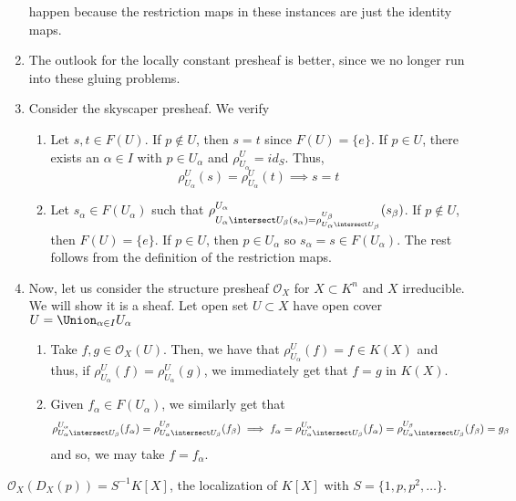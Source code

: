 \documentclass[11pt,leqno,oneside]{amsbook}
\renewcommand{\F}{F} %
\renewcommand{\O}{\mathcal{O}}
\numberwithin{thm}{section}
\begin{document}
\begin{example}
\begin{enumerate}[label=(\arabic*)]
    happen because the restriction maps in these instances are just
    the identity maps.
  \item The outlook for the locally constant presheaf is better, since
    we no longer run into these gluing problems.
  \item Consider the skyscaper presheaf. We verify
    \begin{enumerate}
    \item Let \(s,t \in \F(U)\). If \(p \not \in U\), then \(s=t\)
      since \(\F(U) = \{e\}\). If \(p \in U\), there exists an
      \(\alpha \in I\) with \(p \in U_\alpha\) and \(\rho^U_{U_\alpha}
      = id_S\). Thus, \[
        \rho^U_{U_\alpha}(s) = \rho^U_{U_\alpha}(t) \implies s=t
      \]
    \item Let \(s_\alpha \in \F(U_\alpha)\) such that
      \(\rho^{U_\alpha}_{U_\alpha \intersect U_\beta(s_\alpha) =
        \rho^{U_\beta}_{U_\alpha \intersect U_\beta}}(s_\beta)\). If
      \(p \not \in U\), then \(\F(U) = \{e\}\). If \(p \in U\), then
      \(p \in U_\alpha\) so \(s_\alpha = s \in F(U_\alpha)\). The rest
      follows from the definition of the restriction maps.
    \end{enumerate}
  \item Now, let us consider the structure presheaf \(\O_X\) for \(X
    \subset K^n\) and \(X\) irreducible. We will
    show it is a sheaf. Let open set \(U \subset X\) have open cover
    \(U = \Union_{\alpha \in I} U_\alpha\)
    \begin{enumerate}
    \item Take \(f,g \in \O_X(U)\). Then, we have that
      \(\rho^U_{U_\alpha}(f) = f \in K(X)\) and thus, if
      \(\rho^U_{U_\alpha}(f) = \rho^U_{U_\alpha}(g)\), we immediately
      get that \(f=g\) in \(K(X)\).
    \item Given \(f_\alpha \in \F(U_\alpha)\), we similarly get
      that \[
        \rho^{U_\alpha}_{U_\alpha \intersect U_\beta}(f_\alpha) =
        \rho^{U_\beta}_{U_\alpha \intersect U_\beta}(f_\beta) \implies
        f_\alpha = \rho^{U_\alpha}_{U_\alpha \intersect U_\beta}(f_\alpha) =
        \rho^{U_\beta}_{U_\alpha \intersect U_\beta}(f_\beta) = g_\beta
      \]
      and so, we may take \(f = f_\alpha\). 
    \end{enumerate}
  \end{enumerate}
\end{example}
\begin{prop}
  \(\O_X(D_X(p)) = S^{-1}K[X]\), the localization of \(K[X]\) with \(S
  = \{1,p,p^2, \ldots\}\).
\end{prop}
\end{document}
